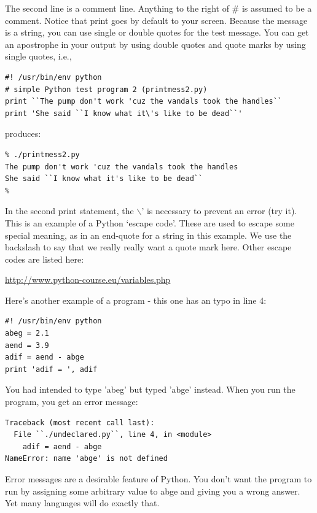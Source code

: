 \documentclass[11pt]{book}
\begin{document}
{{The second line is a comment line.  Anything to the right of \# is assumed to be a comment.
Notice that print goes by default to your screen.  Because the message is a string, you can use single or double quotes
for the test message.  You can get an apostrophe in your output by using double quotes
and quote marks by using single quotes, i.e.,

{ \color{blue} \begin{verbatim}
#! /usr/bin/env python
# simple Python test program 2 (printmess2.py)
print ``The pump don't work 'cuz the vandals took the handles``
print 'She said ``I know what it\'s like to be dead``'
\end{verbatim}}

\noindent
produces:

{ \color{blue} \begin{verbatim}
% ./printmess2.py
The pump don't work 'cuz the vandals took the handles
She said ``I know what it's like to be dead``
%
\end{verbatim}}

\noindent
In the second print statement, the $\backslash$' is necessary to prevent an error (try it).   This is an example of a Python `escape code'.   These are used to escape some special meaning, as in an end-quote for a string in this example. We use the backslash to say that we really really want a quote mark here.   Other escape codes are listed here:

\url{http://www.python-course.eu/variables.php}

Here's another example of a program - this one has an typo in line 4:

{ \color{blue} \begin{verbatim}
#! /usr/bin/env python
abeg = 2.1
aend = 3.9
adif = aend - abge
print 'adif = ', adif
\end{verbatim}}

\noindent
You had intended to type 'abeg' but typed 'abge' instead.  When
you run the program, you get an error message:

{ \color{blue} \begin{verbatim}
Traceback (most recent call last):
  File ``./undeclared.py``, line 4, in <module>
    adif = aend - abge
NameError: name 'abge' is not defined
\end{verbatim}}

\noindent
Error messages are a desirable feature of Python.  You don't want the program
to run by assigning some arbitrary value to abge and giving you
a wrong answer.  Yet many languages will do exactly that.


}}
\end{document}

